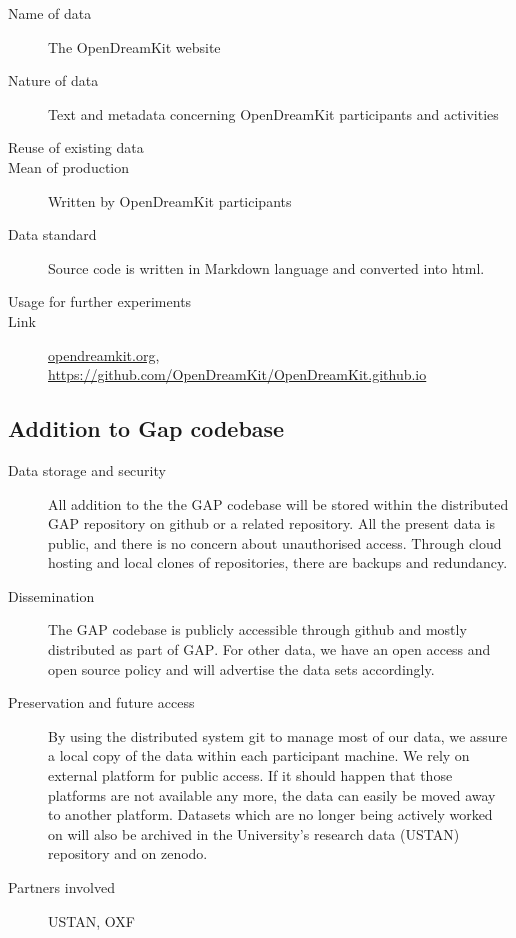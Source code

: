 \documentclass[12pt]{article}
\newcommand{\software}[1]{\textsc{#1}\xspace}
\newcommand{\GAP}{\software{GAP}}
\begin{document}
\begin{description}
\item[Name of data] The OpenDreamKit website
\item[Nature of data] Text and metadata concerning OpenDreamKit participants and activities
\item[Reuse of existing data]
\item[Mean of production] Written by OpenDreamKit participants
\item[Data standard] Source code is written in Markdown language and converted into html.
\item [Usage for further experiments]
\item [Link] \href{http://opendreamkit.org/}{opendreamkit.org}, \href{https://github.com/OpenDreamKit/OpenDreamKit.github.io}{https://github.com/OpenDreamKit/OpenDreamKit.github.io}
\end{description}


\subsection{Addition to Gap codebase}


\begin{description}
\item[Data storage and security] All addition to the the \GAP
  codebase will be stored within the distributed \GAP repository on
  github or a related repository. All the present data is
  public, and there is no concern about unauthorised access. Through
  cloud hosting and local clones of repositories, there are backups
  and redundancy.\label{GAPsec}
\item[Dissemination] The \GAP codebase is publicly accessible through
  github and mostly distributed as part of \GAP.
  For other data, we have an open access and open source policy and will advertise the data sets accordingly.
\label{GAPdiss}

\item[Preservation and future access] By using the distributed system
  git to manage most of our data, we assure a local copy of the data
  within each participant machine. We rely on external platform for public access. If it should happen that those
  platforms are not available any more, the data can easily be moved
  away to another platform. Datasets which are no longer being
  actively worked on will also be archived in the University's
  research data (USTAN) repository and on zenodo.\label{Sagepres}
\item[Partners involved] USTAN, OXF
\end{description}
\end{document}
